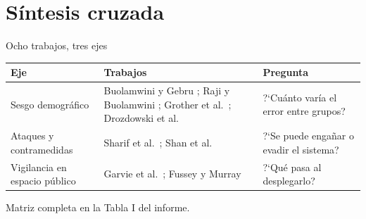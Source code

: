 \section{S\'intesis cruzada}

\begin{frame}{Ocho trabajos, tres ejes}

  \vspace{0.2cm}
  \footnotesize
  \begin{tabularx}{\textwidth}{@{}P{3.2cm} Y P{4.2cm}@{}}
    \toprule
    \textbf{Eje} & \textbf{Trabajos} & \textbf{Pregunta}\\
    \midrule
    Sesgo demogr\'afico &
    Buolamwini y Gebru \cite{buolamwini_gendershades_2018};
    Raji y Buolamwini \cite{raji_actionable_2019};
    Grother et al.\ \cite{grother_nistir8280_2019};
    Drozdowski et al.\ \cite{drozdowski_bias_2020} &
    ?`Cu\'anto var\'ia el error entre grupos?\\
    \addlinespace[4pt]
    Ataques y contramedidas &
    Sharif et al.\ \cite{sharif_accessorize_2016};
    Shan et al.\ \cite{shan_fawkes_2020} &
    ?`Se puede enga\~nar o evadir el sistema?\\
    \addlinespace[4pt]
    Vigilancia en espacio p\'ublico &
    Garvie et al.\ \cite{garvie_perpetual_2016};
    Fussey y Murray \cite{fussey_essex_2019} &
    ?`Qu\'e pasa al desplegarlo?\\
    \bottomrule
  \end{tabularx}

  \vspace{0.3cm}
  {\scriptsize\color{labelgray} Matriz completa en la Tabla I del informe.}
\end{frame}

